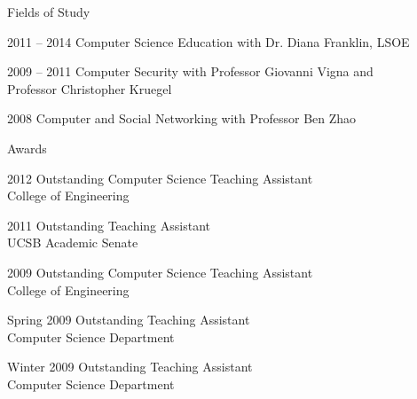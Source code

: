 \begin{vitae}
{\begin{vitaesection}{Fields of Study}
\vspace{-0.1cm}
  \item [2011 -- 2014] Computer Science Education with Dr. Diana Franklin, LSOE
  \item [2009 -- 2011] Computer Security with Professor Giovanni Vigna
    and\\ Professor Christopher Kruegel
  \item [2008] Computer and Social Networking with Professor Ben Zhao
\end{vitaesection}

\begin{vitaesection}{Awards}
\vspace{-0.1cm}
  \item [2012] Outstanding Computer Science Teaching Assistant\\ College of
    Engineering
  \item [2011] Outstanding Teaching Assistant\\ UCSB Academic Senate
  \item [2009] Outstanding Computer Science Teaching Assistant\\ College of
    Engineering
  \item [Spring 2009] Outstanding Teaching Assistant\\ Computer Science
    Department
  \item [Winter 2009] Outstanding Teaching Assistant\\ Computer Science
    Department
\end{vitaesection}

}
\end{vitae}
